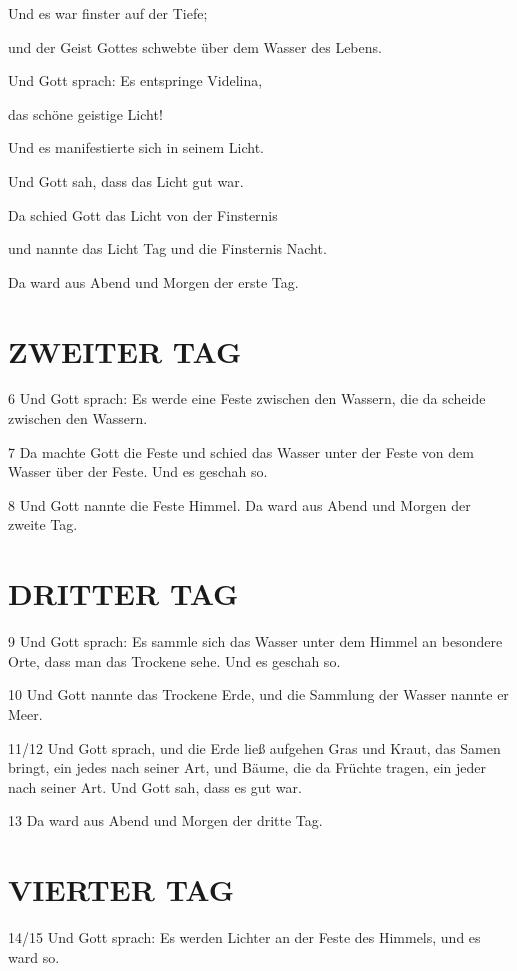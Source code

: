 \documentclass[11pt,a5paper,twoside]{article}
\begin{document}
Und es war finster auf der Tiefe;

und der Geist Gottes schwebte über dem Wasser
des Lebens.

Und Gott sprach: Es entspringe Videlina, 

das schöne geistige Licht! 

Und es manifestierte sich in seinem Licht.

Und Gott sah, dass das Licht gut war.

Da schied Gott das Licht von der Finsternis

und nannte das Licht Tag und die Finsternis
Nacht.

Da ward aus Abend und Morgen der erste
Tag.

\section[Zweiter Tag]{ZWEITER TAG}

6 Und Gott sprach: Es werde eine Feste zwischen
den Wassern, die da scheide zwischen den Wassern.

7 Da machte Gott die Feste und schied das Wasser
unter der Feste von dem Wasser über der Feste.
Und es geschah so.

8 Und Gott nannte die Feste Himmel. Da ward aus
Abend und Morgen der zweite Tag.

\section[Dritter Tag]{DRITTER TAG}

9 Und Gott sprach: Es sammle sich das Wasser
unter dem Himmel an besondere Orte, dass man
das Trockene sehe. Und es geschah so.

10 Und Gott nannte das Trockene Erde, und die
Sammlung der Wasser nannte er Meer.

11/12 Und Gott sprach, und die Erde ließ aufgehen
Gras und Kraut, das Samen bringt, ein jedes nach
seiner Art, und Bäume, die da Früchte tragen, ein
jeder nach seiner Art. Und Gott sah, dass es gut
war.

13 Da ward aus Abend und Morgen der dritte Tag.

\section[Vierter Tag]{VIERTER TAG}

14/15 Und Gott sprach: Es werden Lichter an der
Feste des Himmels, und es ward so.
\end{document}

